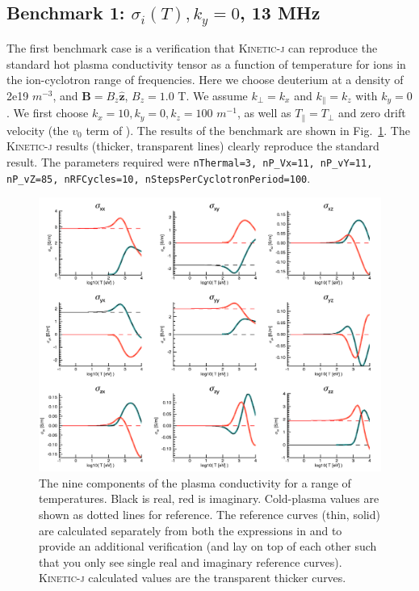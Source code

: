 \documentclass[final,5p,times,twocolumn]{elsarticle}
\let\oldhat\hat
\renewcommand{\vec}[1]{\mathbf{#1}}
\renewcommand{\hat}[1]{\oldhat{\mathbf{#1}}}
\newcommand{\kj}{\textsc{Kinetic-j}\xspace}
\begin{document}
\subsection{Benchmark 1: $\sigma_i\left(T\right), k_{y}=0$, 13 MHz}
\label{section:verification1}
%
The first benchmark case is a verification that \kj can reproduce the standard hot plasma conductivity tensor as a function of temperature for ions in the ion-cyclotron range of frequencies. Here we choose deuterium at a density of 2e19 $m^{-3}$, and $\vec{B}=B_z\hat{\vec{z}}$, $B_z=1.0$ T. We assume $k_\perp=k_x$ and $k_\parallel=k_z$ with $k_y=0$. We first choose $k_x=10,k_y=0,k_z=100$ $m^{-1}$, as well as $T_\parallel=T_\perp$ and zero drift velocity (the $v_0$ term of \cite{swanson}). The results of the benchmark are shown in Fig.~\ref{fig:b1}. The \kj results (thicker, transparent lines) clearly reproduce the standard result. The parameters required were \texttt{nThermal=3, nP\_Vx=11, nP\_vY=11, nP\_vZ=85, nRFCycles=10, nStepsPerCyclotronPeriod=100}.
%
\begin{figure}
\centering
\includegraphics[]{figures/benchmark1}
\caption{\label{fig:b1}The nine components of the plasma conductivity for a range of temperatures. Black is real, red is imaginary. Cold-plasma values are shown as dotted lines for reference. The reference curves (thin, solid) are calculated separately from both the expressions in \cite{brambilla} and \cite{swanson} to provide an additional verification (and lay on top of each other such that you only see single real and imaginary reference curves). \kj calculated values are the transparent thicker curves.}
\end{figure}
%
\end{document}
